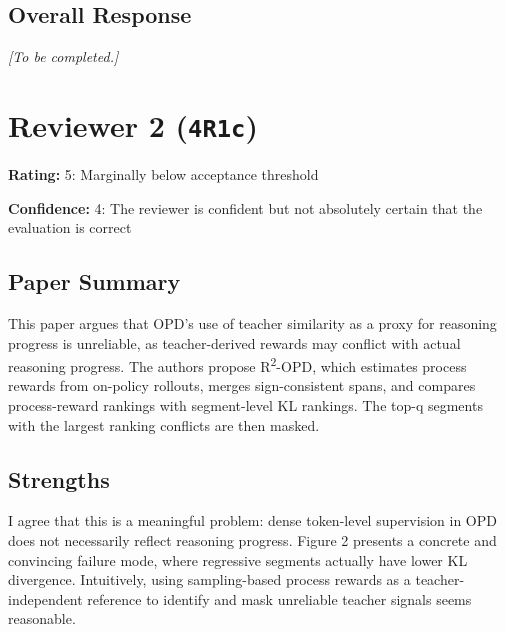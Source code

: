 \documentclass[11pt,a4paper]{article}
\begin{document}
\subsection*{Overall Response}
\par{}
\begin{responsebox}[frametitle={Overall Response to Reviewer 1 (gURK)},nobreak=true]
\textit{[To be completed.]}\par\vspace{1em}
\end{responsebox}



\clearpage

\section{Reviewer 2 (\texttt{4R1c})}
\label{reviewer:2}
\noindent\textbf{Rating:} 5: Marginally below acceptance threshold\par
\noindent\textbf{Confidence:} 4: The reviewer is confident but not absolutely certain that the evaluation is correct

\subsection*{Paper Summary}
This paper argues that OPD's use of teacher similarity as a proxy for reasoning progress is unreliable, as teacher-derived rewards may conflict with actual reasoning progress. The authors propose R\textsuperscript{2}-OPD, which estimates process rewards from on-policy rollouts, merges sign-consistent spans, and compares process-reward rankings with segment-level KL rankings. The top-q segments with the largest ranking conflicts are then masked.

\subsection*{Strengths}
I agree that this is a meaningful problem: dense token-level supervision in OPD does not necessarily reflect reasoning progress. Figure 2 presents a concrete and convincing failure mode, where regressive segments actually have lower KL divergence. Intuitively, using sampling-based process rewards as a teacher-independent reference to identify and mask unreliable teacher signals seems reasonable.
\end{document}
